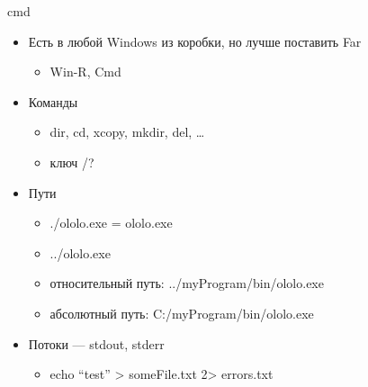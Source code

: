 \documentclass{../../slides-style}
\begin{document}
    \begin{frame}{cmd}
        \begin{itemize}
            \item Есть в любой Windows из коробки, но лучше поставить Far
            \begin{itemize}
                \item Win-R, Cmd
            \end{itemize}
            \item Команды
            \begin{itemize}
                \item dir, cd, xcopy, mkdir, del, …
                \item ключ /?
            \end{itemize}
            \item Пути
            \begin{itemize}
                \item ./ololo.exe = ololo.exe
                \item ../ololo.exe
                \item относительный путь: ../myProgram/bin/ololo.exe
                \item абсолютный путь: C:/myProgram/bin/ololo.exe
            \end{itemize}
            \item Потоки --- stdout, stderr
            \begin{itemize}
                \item echo ``test'' > someFile.txt 2> errors.txt
            \end{itemize}
        \end{itemize}
    \end{frame}
\end{document}

